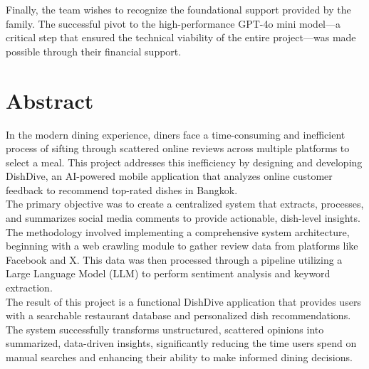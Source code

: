 Finally, the team wishes to recognize the foundational support provided by the family. The successful pivot to the high-performance GPT-4o mini model—a critical step that ensured the technical viability of the entire project—was made possible through their financial support.

\chapter*{Abstract}
In the modern dining experience, diners face a time-consuming and inefficient process of sifting through scattered online reviews across multiple platforms to select a meal. This project addresses this inefficiency by designing and developing DishDive, an AI-powered mobile application that analyzes online customer feedback to recommend top-rated dishes in Bangkok.\\

The primary objective was to create a centralized system that extracts, processes, and summarizes social media comments to provide actionable, dish-level insights. The methodology involved implementing a comprehensive system architecture, beginning with a web crawling module to gather review data from platforms like Facebook and X. This data was then processed through a pipeline utilizing a Large Language Model (LLM) to perform sentiment analysis and keyword extraction.\\

The result of this project is a functional DishDive application that provides users with a searchable restaurant database and personalized dish recommendations. The system successfully transforms unstructured, scattered opinions into summarized, data-driven insights, significantly reducing the time users spend on manual searches and enhancing their ability to make informed dining decisions.

\tableofcontents